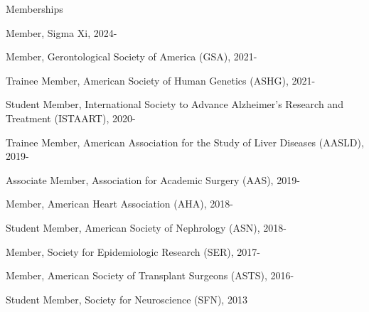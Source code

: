 \documentclass[10pt]{article}
\renewcommand{\section}[1]{\pagebreak[3]%
    \vspace{1.3\baselineskip}%
    \phantomsection\addcontentsline{toc}{section}{#1}%
    \noindent\llap{\scshape\smash{\parbox[t]{\marginparwidth}{\hyphenpenalty=10000\raggedright #1}}}%
    \vspace{-\baselineskip}\par}
\begin{document}
\vspace{2mm}

Memberships

\begin{innerlist}
\item Member, Sigma Xi, 2024-
\item Member, Gerontological Society of America (GSA), 2021-
\item Trainee Member, American Society of Human Genetics (ASHG), 2021-
\item Student Member, International Society to Advance Alzheimer's Research and Treatment (ISTAART), 2020-
\item Trainee Member, American Association for the Study of
  Liver Diseases (AASLD), 2019-
\item Associate Member, Association for Academic Surgery (AAS), 2019-
\item Member, American Heart Association (AHA), 2018-
\item Student Member, American Society of Nephrology (ASN), 2018-
\item Member, Society for Epidemiologic Research (SER), 2017-
\item Member, American Society of Transplant Surgeons (ASTS), 2016-
\item Student Member, Society for Neuroscience (SFN), 2013

\end{innerlist}

\end{document}
